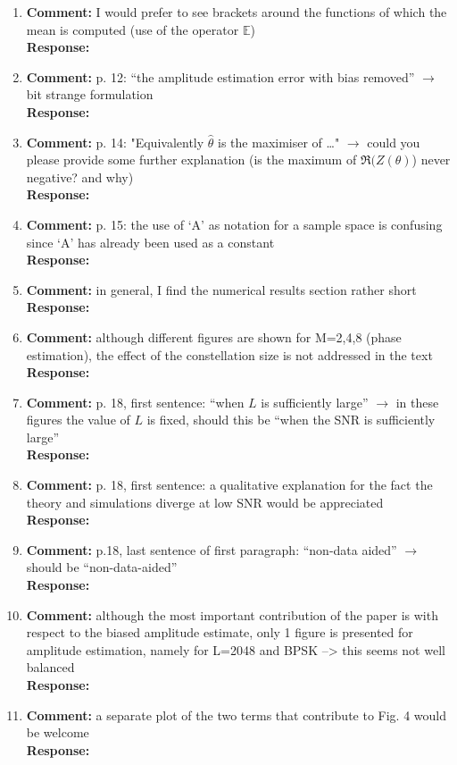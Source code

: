 \documentclass{article}
\begin{document}
\begin{enumerate}
\item \textbf{Comment:} I would prefer to see brackets around the functions of which the mean is computed (use of the operator $\mathbb E$) \\
\textbf{Response:}

\item \textbf{Comment:} p. 12: ``the amplitude estimation error with bias removed'' $\to$ bit strange formulation \\
\textbf{Response:}

\item \textbf{Comment:} p. 14: "Equivalently $\hat\theta$ is the maximiser of \dots" $\to$ could you please provide some further explanation (is the maximum of $\Re(Z(\theta)$) never negative? and why) \\
\textbf{Response:}

\item \textbf{Comment:} p. 15: the use of `A' as notation for a sample space is confusing since `A' has already been used as a constant \\
\textbf{Response:}

\item \textbf{Comment:} in general, I find the numerical results section rather short \\
\textbf{Response:}

\item \textbf{Comment:} although different figures are shown for M=2,4,8 (phase estimation), the effect of the constellation size is not addressed in the text  \\
\textbf{Response:}

\item \textbf{Comment:} p. 18, first sentence: ``when $L$ is sufficiently large'' $\to$ in these figures the value of $L$ is fixed, should this be ``when the SNR is sufficiently large''  \\
\textbf{Response:}

\item \textbf{Comment:} p. 18, first sentence: a qualitative explanation for the fact the theory and simulations diverge at low SNR would be appreciated  \\
\textbf{Response:}

\item \textbf{Comment:} p.18, last sentence of first paragraph: ``non-data aided'' $\to$ should be ``non-data-aided''  \\
\textbf{Response:}

\item \textbf{Comment:}  although the most important contribution of the paper is with respect to the biased amplitude estimate, only 1 figure is presented for amplitude estimation, namely for L=2048 and BPSK --> this seems not well balanced  \\
\textbf{Response:}

\item \textbf{Comment:}  a separate plot of the two terms that contribute to Fig. 4 would be welcome \\
\textbf{Response:}

\end{enumerate}
\end{document}
